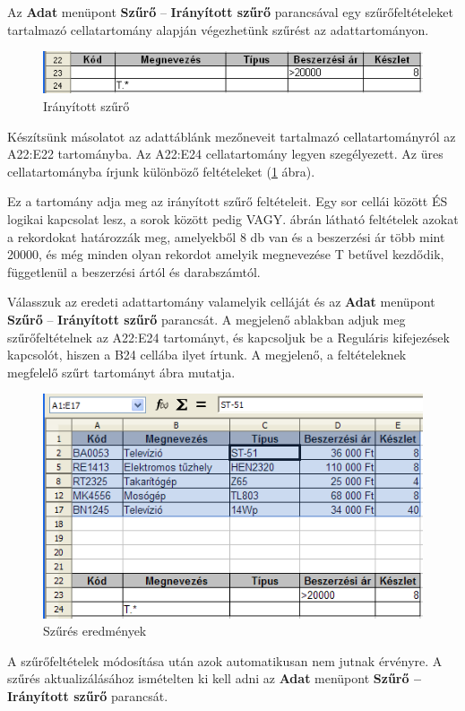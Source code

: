 Az \textbf{Adat} menüpont \textbf{Szűrő} --
\textbf{Irányított szűrő} parancsával egy
szűrőfeltételeket tartalmazó cellatartomány alapján
végezhetünk szűrést az adattartományon.

\begin{figure}[!h]
\begin{center}
\includegraphics[width=12.282cm]{oocalcv2-img118.png}
\caption{Irányított szűrő}\label{IrányítottSzűrő}
\end{center}
\end{figure}

Készítsünk másolatot az adattáblánk mezőneveit
tartalmazó cellatartományról az A22:E22 tartományba. Az A22:E24
cellatartomány legyen szegélyezett. Az üres cellatartományba
írjunk különböző feltételeket (\ref{IrányítottSzűrő} ábra).

Ez a tartomány adja meg az irányított szűrő feltételeit.
Egy sor cellái között ÉS logikai kapcsolat lesz, a sorok
között pedig VAGY.  ábrán látható feltételek azokat
a rekordokat határozzák meg, amelyekből 8 db van és a
beszerzési ár több mint 20000, és még minden olyan rekordot
amelyik megnevezése T betűvel kezdődik, függetlenül a
beszerzési ártól és darabszámtól.

Válasszuk az eredeti adattartomány valamelyik celláját és
az \textbf{Adat} menüpont \textbf{Szűrő} --
\textbf{Irányított szűrő} parancsát. A megjelenő
ablakban adjuk meg szűrőfeltételnek az A22:E24 tartományt,
és kapcsoljuk be a Reguláris kifejezések kapcsolót, hiszen a
B24 cellába ilyet írtunk. A megjelenő, a feltételeknek
megfelelő szűrt tartományt  ábra mutatja.

\begin{figure}[!h]
\begin{center}
\includegraphics[width=12.778cm]{oocalcv2-img119.png}
\caption{Szűrés eredmények}\label{SzűrésEredmények}
\end{center}
\end{figure}

A szűrőfeltételek módosítása után azok automatikusan
nem jutnak érvényre. A szűrés aktualizálásához
ismételten ki kell adni az \textbf{Adat} menüpont
\textbf{Szűrő -- Irányított szűrő} parancsát.

